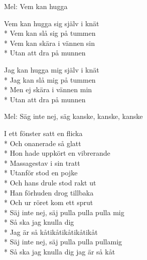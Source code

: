 \begin{SongText}
    \begin{SongInfo}
        Mel: Vem kan hugga
    \end{SongInfo}
    \begin{SongVerse}
        Vem kan hugga sig själv i knät\\*%
        Vem kan slå sig på tummen\\*%
        Vem kan skära i vännen sin\\*%
        Utan att dra på munnen
    \end{SongVerse}
    \begin{SongVerse}
        Jag kan hugga mig själv i knät\\*%
        Jag kan slå mig på tummen\\*%
        Men ej skära i vännen min\\*%
        Utan att dra på munnen
    \end{SongVerse}
\end{SongText}
\begin{SongText}
    \begin{SongInfo}
        Mel: Säg inte nej, säg kanske, kanske, kanske
    \end{SongInfo}
    \begin{SongVerse}
        I ett fönster satt en flicka\\*%
        Och onanerade så glatt\\*%
        Hon hade uppkört en vibrerande\\*%
        Massagestav i sin tratt\\*%
        Utanför stod en pojke\\*%
        Och hans drule stod rakt ut\\*%
        Han förhuden drog tillbaka\\*%
        Och ur röret kom ett sprut\\*%
        Säj inte nej, säj pulla pulla pulla mig\\*%
        Så ska jag knulla dig\\*%
        Jag är så kåtikåtikåtikåtikåt\\*%
        Säj inte nej, säj pulla pulla pullamig\\*%
        Så ska jag knulla dig jag är så kåt
    \end{SongVerse}
\end{SongText}
